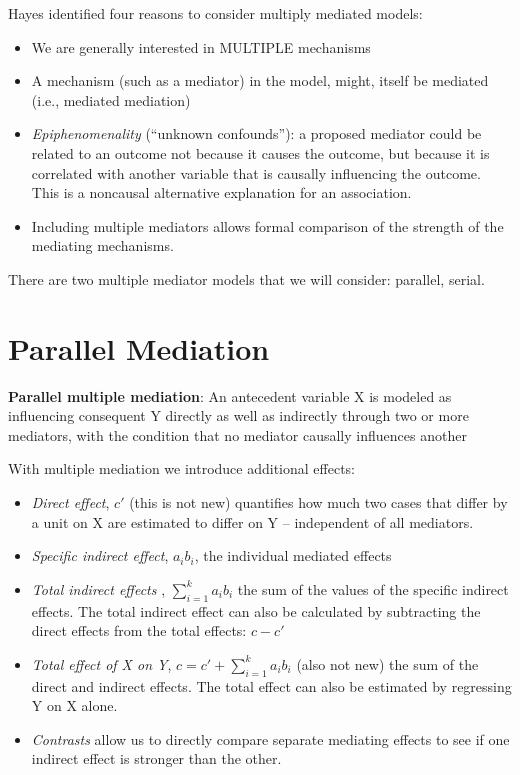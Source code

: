 \documentclass[
]{book}
\providecommand{\tightlist}{%
  \setlength{\itemsep}{0pt}\setlength{\parskip}{0pt}}
\begin{document}
Hayes \citeyearpar{hayes_introduction_2018} identified four reasons to consider multiply mediated models:

\begin{itemize}
\tightlist
\item
  We are generally interested in MULTIPLE mechanisms
\item
  A mechanism (such as a mediator) in the model, might, itself be mediated (i.e., mediated mediation)
\item
  \emph{Epiphenomenality} (``unknown confounds''): a proposed mediator could be related to an outcome not because it causes the outcome, but because it is correlated with another variable that is causally influencing the outcome. This is a noncausal alternative explanation for an association.
\item
  Including multiple mediators allows formal comparison of the strength of the mediating mechanisms.
\end{itemize}

There are two multiple mediator models that we will consider: parallel, serial.

\hypertarget{parallel-mediation}{%
\section{Parallel Mediation}\label{parallel-mediation}}

\textbf{Parallel multiple mediation}: An antecedent variable X is modeled as influencing consequent Y directly as well as indirectly through two or more mediators, with the condition that no mediator causally influences another \citep[p.~149]{hayes_introduction_2018}

With multiple mediation we introduce additional effects:

\begin{itemize}
\tightlist
\item
  \emph{Direct effect}, \(c'\) (this is not new) quantifies how much two cases that differ by a unit on X are estimated to differ on Y -- independent of all mediators.
\item
  \emph{Specific indirect effect}, \(a_{i}b_{i}\), the individual mediated effects
\item
  \emph{Total indirect effects }, \(\sum_{i=1}^{k}a_{i}b_{i}\) the sum of the values of the specific indirect effects. The total indirect effect can also be calculated by subtracting the direct effects from the total effects: \(c - c'\)
\item
  \emph{Total effect of X on Y}, \(c = c' + \sum_{i=1}^{k}a_{i}b_{i}\) (also not new) the sum of the direct and indirect effects. The total effect can also be estimated by regressing Y on X alone.
\item
  \emph{Contrasts} allow us to directly compare separate mediating effects to see if one indirect effect is stronger than the other.
\end{itemize}
\end{document}
